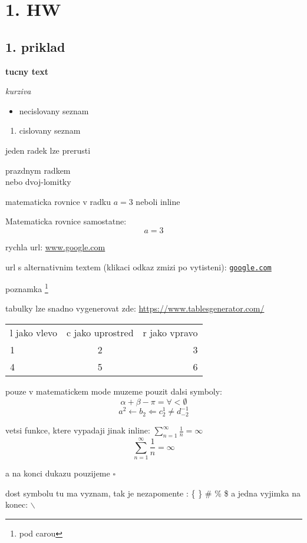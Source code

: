 \documentclass[a4paper]{article}
\begin{document}
\pagestyle{fancy}

\section*{1. HW}
\subsection*{1. priklad}

\textbf{tucny text}

\textit{kurziva}

\begin{itemize}
    \item necislovany seznam
\end{itemize}

\begin{enumerate}
    \item cislovany seznam
\end{enumerate}


jeden radek
lze prerusti

prazdnym radkem \\
nebo dvoj-lomitky

matematicka rovnice v radku $a=3$ neboli inline

Matematicka rovnice samostatne:
$$a=3$$

rychla url: \url{www.google.com}

url s alternativnim textem (klikaci odkaz zmizi po vytisteni): \href{https://google.com}{\nolinkurl{google.com}}

poznamka \footnote{pod carou}

tabulky lze snadno vygenerovat zde: \url{https://www.tablesgenerator.com/}

\begin{table}[h]
    \begin{tabular}{|l|c|r|} %
    l jako vlevo & c jako uprostred & r jako vpravo \\
    1 & 2 & 3 \\ \hline %
    4 & 5 & 6
    \end{tabular}
\end{table}

pouze v matematickem mode muzeme pouzit dalsi symboly:
$$\alpha+\beta-\pi=\forall<\emptyset$$
$$a^2 \leftarrow b_2 \Leftarrow c^1_2 \neq d^{-1}_{-2}$$

vetsi funkce, ktere vypadaji jinak inline: $\sum^{\infty}_{n=1} \frac{1}{n} = \infty$ 
$$\sum^{\infty}_{n=1} \frac{1}{n} = \infty$$

a na konci dukazu pouzijeme \hfill$\square$

dost symbolu tu ma vyznam, tak je nezapomente : \{ \} \# \% \$
a jedna vyjimka na konec: $\backslash$
\end{document}
